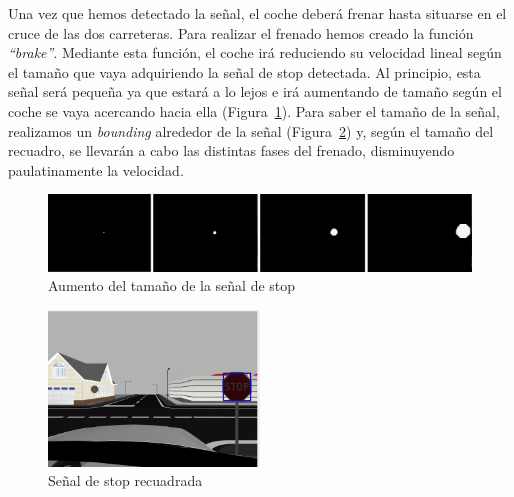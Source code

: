 Una vez que hemos detectado la señal, el coche deberá frenar hasta situarse en el cruce de las dos carreteras. Para realizar el frenado hemos creado la función \textit{``brake''}. Mediante esta función, el coche irá reduciendo su velocidad lineal según el tamaño que vaya adquiriendo la señal de stop detectada. Al principio, esta señal será pequeña ya que estará a lo lejos e irá aumentando de tamaño según el coche se vaya acercando hacia ella (Figura~\ref{fig.brake}). Para saber el tamaño de la señal, realizamos un \textit{bounding} alrededor de la señal (Figura~\ref{fig.stopRecuadro}) y, según el tamaño del recuadro, se llevarán a cabo las distintas fases del frenado, disminuyendo paulatinamente la velocidad. \\

\begin{figure}[H]
  \begin{center}
    \includegraphics[width=1.0\textwidth]{figures/Stop/brake.jpg}
		\caption{Aumento del tamaño de la señal de stop}
		\label{fig.brake}
		\end{center}
\end{figure}

\begin{figure}[H]
  \begin{center}
    \includegraphics[width=0.5\textwidth]{figures/Stop/stopRecuadro.jpg}
		\caption{Señal de stop recuadrada}
		\label{fig.stopRecuadro}
		\end{center}
\end{figure}

